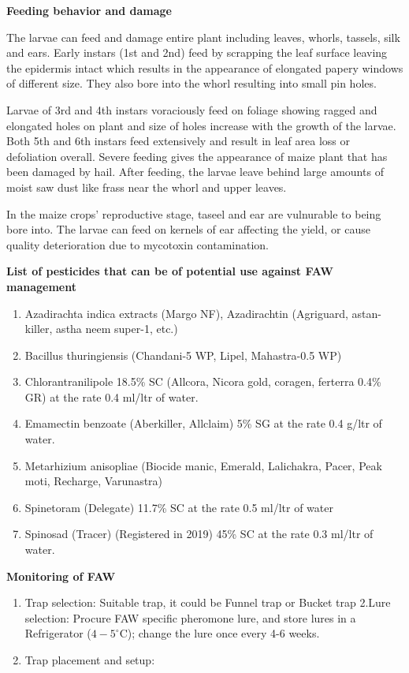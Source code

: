 \documentclass[
  openany]{book}
\providecommand{\tightlist}{%
  \setlength{\itemsep}{0pt}\setlength{\parskip}{0pt}}
\begin{document}
\textbf{Feeding behavior and damage}

The larvae can feed and damage entire plant including leaves, whorls, tassels, silk and ears. Early instars (1st and 2nd) feed by scrapping the leaf surface leaving the epidermis intact which results in the appearance of elongated papery windows of different size. They also bore into the whorl resulting into small pin holes.

Larvae of 3rd and 4th instars voraciously feed on foliage showing ragged and elongated holes on plant and size of holes increase with the growth of the larvae. Both 5th and 6th instars feed extensively and result in leaf area loss or defoliation overall. Severe feeding gives the appearance of maize plant that has been damaged by hail. After feeding, the larvae leave behind large amounts of moist saw dust like frass near the whorl and upper leaves.

In the maize crops' reproductive stage, taseel and ear are vulnurable to being bore into. The larvae can feed on kernels of ear affecting the yield, or cause quality deterioration due to mycotoxin contamination.

\textbf{List of pesticides that can be of potential use against FAW management}

\begin{enumerate}
\def\labelenumi{\arabic{enumi}.}
\tightlist
\item
  Azadirachta indica extracts (Margo NF), Azadirachtin (Agriguard, astan-killer, astha neem super-1, etc.)
\item
  Bacillus thuringiensis (Chandani-5 WP, Lipel, Mahastra-0.5 WP)
\item
  Chlorantranilipole 18.5\% SC (Allcora, Nicora gold, coragen, ferterra 0.4\% GR) at the rate 0.4 ml/ltr of water.
\item
  Emamectin benzoate (Aberkiller, Allclaim) 5\% SG at the rate 0.4 g/ltr of water.
\item
  Metarhizium anisopliae (Biocide manic, Emerald, Lalichakra, Pacer, Peak moti, Recharge, Varunastra)
\item
  Spinetoram (Delegate) 11.7\% SC at the rate 0.5 ml/ltr of water
\item
  Spinosad (Tracer) (Registered in 2019) 45\% SC at the rate 0.3 ml/ltr of water.
\end{enumerate}

\textbf{Monitoring of FAW}

\begin{enumerate}
\def\labelenumi{\arabic{enumi}.}
\tightlist
\item
  Trap selection: Suitable trap, it could be Funnel trap or Bucket trap
  2.Lure selection: Procure FAW specific pheromone lure, and store lures in a Refrigerator (\(4-5^\circ\)C); change the lure once every 4-6 weeks.
\item
  Trap placement and setup:
\end{enumerate}
\end{document}
